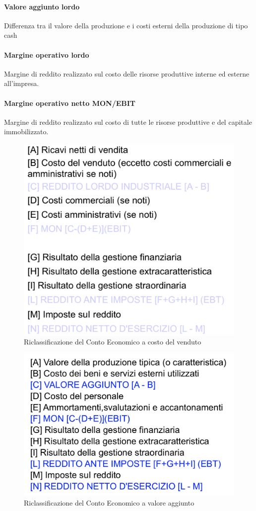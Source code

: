 \documentclass{report}
\begin{document}
	\paragraph{Valore aggiunto lordo} Differenza tra il valore della produzione e i costi esterni della produzione di tipo cash
	\paragraph{Margine operativo lordo} Margine di reddito realizzato sul costo delle risorse produttive interne ed esterne all'impresa.
	\paragraph{Margine operativo netto MON/EBIT} Margine di reddito realizzato sul costo di tutte le risorse produttive e del capitale immobilizzato.
	\begin{figure}[H]
		\centering
		\includegraphics[width=0.7\linewidth]{images/ce-costo-venduto}
		\caption{Riclassificazione del Conto Economico a costo del venduto}
		\label{fig:ce-costo-venduto}
	\end{figure}
	\begin{figure}[H]
		\centering
		\includegraphics[width=0.7\linewidth]{images/ce-valore-aggiunto}
		\caption{Riclassificazione del Conto Economico a valore aggiunto}
		\label{fig:ce-valore-aggiunto}
	\end{figure}
\end{document}
